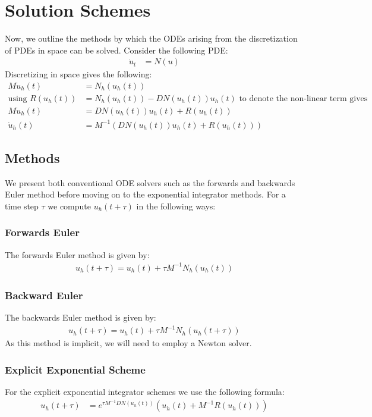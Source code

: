 \section{Solution Schemes}
Now, we outline the methods by which the ODEs arising from the discretization of PDEs in space can be solved. 
Consider the following PDE:
\begin{align*}
    \dot u_t &= N(u)
\end{align*}
Discretizing in space gives the following:
\begin{align*}
M\dot u_h(t) &= N_h(u_h(t))\\ %
\text{using } R(u_h(t)) &= N_h(u_h(t)) - DN(u_h(t))u_h(t) \text{ to denote the non-linear term gives}\\
M\dot u_h(t) &= DN(u_h(t))u_h(t) + R(u_h(t))\\
\dot u_h(t) &= M^{-1}(DN(u_h(t))u_h(t) + R(u_h(t)))
\end{align*}
\subsection{Methods}
We present both conventional ODE solvers such as the forwards and backwards Euler method before moving on to the exponential integrator methods.
For a time step $\tau$ we compute $u_h(t+\tau)$ in the following ways: 

\subsubsection{Forwards Euler}
The forwards Euler method is given by:
\begin{align*}
u_h(t+\tau) = u_h(t) + \tau M^{-1}N_h(u_h(t))
\end{align*}

\subsubsection{Backward Euler}
The backwards Euler method is given by:
\begin{align*}
u_h(t+\tau) = u_h(t) + \tau M^{-1}N_h(u_h(t+\tau))
\end{align*}
As this method is implicit, we will need to employ a Newton solver.

\subsubsection{Explicit Exponential Scheme} %
For the explicit exponential integrator schemes we use the following formula:
\begin{align*}
u_h(t+\tau) &= e^{\tau M^{-1} DN(u_h(t))}(u_h(t) + M^{-1}R(u_h(t)))
\end{align*}


